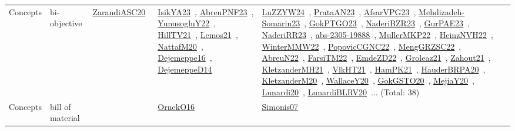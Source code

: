 {\begin{longtable}{lp{3cm}>{\raggedright\arraybackslash}p{6cm}>{\raggedright\arraybackslash}p{6cm}>{\raggedright\arraybackslash}p{8cm}}
\index{bi-objective}\index{Concepts!bi-objective}Concepts & bi-objective & \href{../works/ZarandiASC20.pdf}{ZarandiASC20}~\cite{ZarandiASC20} & \href{../works/IsikYA23.pdf}{IsikYA23}~\cite{IsikYA23}, \href{../works/AbreuPNF23.pdf}{AbreuPNF23}~\cite{AbreuPNF23}, \href{../works/YunusogluY22.pdf}{YunusogluY22}~\cite{YunusogluY22}, \href{../works/HillTV21.pdf}{HillTV21}~\cite{HillTV21}, \href{../works/Lemos21.pdf}{Lemos21}~\cite{Lemos21}, \href{../works/NattafM20.pdf}{NattafM20}~\cite{NattafM20}, \href{../works/Dejemeppe16.pdf}{Dejemeppe16}~\cite{Dejemeppe16}, \href{../works/DejemeppeD14.pdf}{DejemeppeD14}~\cite{DejemeppeD14} & \href{../works/LuZZYW24.pdf}{LuZZYW24}~\cite{LuZZYW24}, \href{../works/PrataAN23.pdf}{PrataAN23}~\cite{PrataAN23}, \href{../works/AfsarVPG23.pdf}{AfsarVPG23}~\cite{AfsarVPG23}, \href{../works/Mehdizadeh-Somarin23.pdf}{Mehdizadeh-Somarin23}~\cite{Mehdizadeh-Somarin23}, \href{../works/GokPTGO23.pdf}{GokPTGO23}~\cite{GokPTGO23}, \href{../works/NaderiBZR23.pdf}{NaderiBZR23}~\cite{NaderiBZR23}, \href{../works/GurPAE23.pdf}{GurPAE23}~\cite{GurPAE23}, \href{../works/NaderiRR23.pdf}{NaderiRR23}~\cite{NaderiRR23}, \href{../works/abs-2305-19888.pdf}{abs-2305-19888}~\cite{abs-2305-19888}, \href{../works/MullerMKP22.pdf}{MullerMKP22}~\cite{MullerMKP22}, \href{../works/HeinzNVH22.pdf}{HeinzNVH22}~\cite{HeinzNVH22}, \href{../works/WinterMMW22.pdf}{WinterMMW22}~\cite{WinterMMW22}, \href{../works/PopovicCGNC22.pdf}{PopovicCGNC22}~\cite{PopovicCGNC22}, \href{../works/MengGRZSC22.pdf}{MengGRZSC22}~\cite{MengGRZSC22}, \href{../works/AbreuN22.pdf}{AbreuN22}~\cite{AbreuN22}, \href{../works/FarsiTM22.pdf}{FarsiTM22}~\cite{FarsiTM22}, \href{../works/EmdeZD22.pdf}{EmdeZD22}~\cite{EmdeZD22}, \href{../works/Groleaz21.pdf}{Groleaz21}~\cite{Groleaz21}, \href{../works/Zahout21.pdf}{Zahout21}~\cite{Zahout21}, \href{../works/KletzanderMH21.pdf}{KletzanderMH21}~\cite{KletzanderMH21}, \href{../works/VlkHT21.pdf}{VlkHT21}~\cite{VlkHT21}, \href{../works/HamPK21.pdf}{HamPK21}~\cite{HamPK21}, \href{../works/HauderBRPA20.pdf}{HauderBRPA20}~\cite{HauderBRPA20}, \href{../works/KletzanderM20.pdf}{KletzanderM20}~\cite{KletzanderM20}, \href{../works/WallaceY20.pdf}{WallaceY20}~\cite{WallaceY20}, \href{../works/GokGSTO20.pdf}{GokGSTO20}~\cite{GokGSTO20}, \href{../works/MejiaY20.pdf}{MejiaY20}~\cite{MejiaY20}, \href{../works/Lunardi20.pdf}{Lunardi20}~\cite{Lunardi20}, \href{../works/LunardiBLRV20.pdf}{LunardiBLRV20}~\cite{LunardiBLRV20}... (Total: 38)\\
\index{bill of material}\index{Concepts!bill of material}Concepts & bill of material &  & \href{../works/OrnekO16.pdf}{OrnekO16}~\cite{OrnekO16} & \href{../works/Simonis07.pdf}{Simonis07}~\cite{Simonis07}\\

\end{longtable}}
